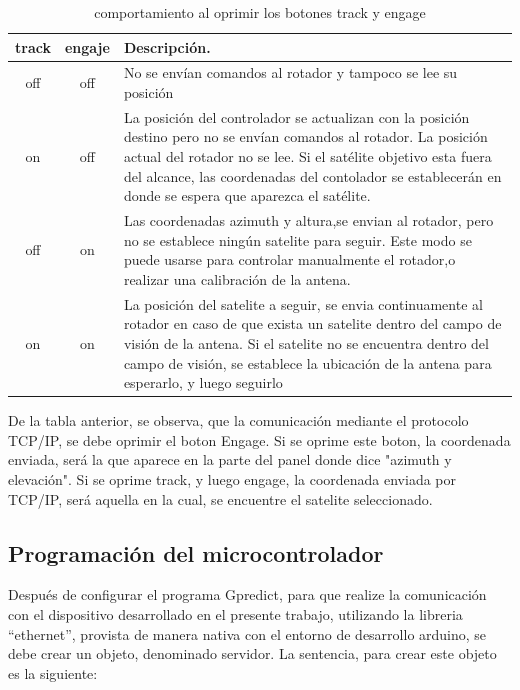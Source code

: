 \begin{table}[h!]
	\begin{tabular}{|c|c|p{11.0cm}|}
		\hline 
		track & engaje & Descripción. \\
		\hline 
		off & off  & No se envían comandos al rotador y tampoco se lee su posición \\ 
		\hline 
		on  & off  &   La posición del controlador se actualizan con la posición destino pero no se envían comandos al rotador. La posición actual del rotador no se lee. Si el satélite objetivo esta fuera del alcance, las coordenadas del contolador se establecerán en donde se espera que aparezca el satélite. \\
		\hline 
		off & on  &   Las coordenadas azimuth y altura,se envian al rotador, pero no se establece ningún satelite para seguir.  Este modo se puede usarse para controlar manualmente el rotador,o realizar una calibración de la antena. \\ 
		\hline 
		on  & on   &La posición del satelite a seguir, se envia continuamente al rotador en caso de que exista un satelite dentro del campo de visión de la antena. Si el satelite no se encuentra dentro del campo de visión, se establece la ubicación de la antena para esperarlo, y luego seguirlo \\
		\hline 
				
	\end{tabular}
	\caption{comportamiento al oprimir los botones track y engage}
\end{table}

De la tabla anterior, se observa, que la comunicación mediante el protocolo TCP/IP, se debe oprimir el boton Engage. Si se oprime este boton, la coordenada enviada, será la que aparece en la parte del panel donde dice "azimuth y elevación". Si se oprime track, y luego engage, la coordenada enviada por TCP/IP, será aquella en la cual, se encuentre el satelite seleccionado. 

\subsection{Programación del microcontrolador} 

Después de configurar el programa Gpredict, para que realize la comunicación con el dispositivo desarrollado en el presente trabajo, utilizando la libreria ``ethernet'', provista de manera nativa con el entorno de desarrollo arduino, se debe crear un objeto, denominado servidor. La sentencia, para crear este objeto es la siguiente: 

